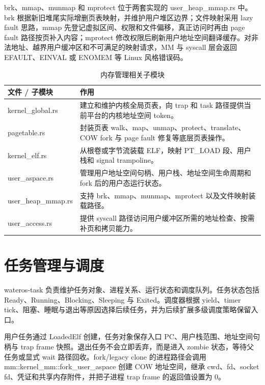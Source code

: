 \documentclass[12pt,openany,oneside,AutoFakeBold=true]{ctexbook}
\newcommand{\code}[1]{\textnormal{\rmfamily #1}}
\newcommand{\syscall}[1]{\textnormal{\rmfamily #1}}
\begin{document}
\syscall{brk}、\syscall{mmap}、\syscall{munmap} 和 \syscall{mprotect} 位于两套实现的 \code{user\_heap\_mmap.rs} 中。\syscall{brk} 根据新旧堆尾实际增删页表映射，并维护用户堆区边界；文件映射采用 lazy fault 思路，\syscall{mmap} 先登记虚拟区间、权限和文件偏移，真正访问时再由 page fault 路径按页补入内容；\syscall{mprotect} 修改权限后刷新用户地址空间翻译缓存。对非法地址、越界用户缓冲区和不可满足的映射请求，MM 与 syscall 层会返回 \code{EFAULT}、\code{EINVAL} 或 \code{ENOMEM} 等 Linux 风格错误码。

\begin{longtable}{>{\raggedright\arraybackslash}p{4.5cm}>{\raggedright\arraybackslash}p{8.8cm}}
  \caption{内存管理相关子模块}\label{tab:mm-submodules}\\
  \toprule[1.5pt]
  文件 / 子模块 & 作用 \\
  \midrule[1pt]
  \code{kernel\_global.rs} & 建立和维护内核全局页表，向 trap 和 task 路径提供当前平台的内核地址空间 token。 \\
  \code{pagetable.rs} & 封装页表 walk、map、unmap、protect、translate、COW fork 与 page fault 修复等底层页表操作。 \\
  \code{kernel\_elf.rs} & 从根卷或字节流装载 ELF，映射 \code{PT\_LOAD} 段、用户栈和 signal trampoline。 \\
  \code{user\_aspace.rs} & 管理用户地址空间句柄、用户栈、地址空间生命周期和 fork 后的用户态运行状态。 \\
  \code{user\_heap\_mmap.rs} & 支持 \syscall{brk}、\syscall{mmap}、\syscall{munmap}、\syscall{mprotect} 以及文件映射装载路径。 \\
  \code{user\_access.rs} & 提供 syscall 路径访问用户缓冲区所需的地址检查、按需补页和拷贝能力。 \\
  \bottomrule[1.5pt]
\end{longtable}


\section{任务管理与调度}

\code{wateros-task} 负责维护任务对象、进程关系、运行状态和调度队列。任务状态包括 \code{Ready}、\code{Running}、\code{Blocking}、\code{Sleeping} 与 \code{Exited}。调度器根据 yield、timer tick、阻塞、睡眠与退出等原因选择后续任务，并为后续扩展多级调度策略保留入口。

用户任务通过 \code{LoadedElf} 创建，任务对象保存入口 PC、用户栈范围、地址空间句柄与 trap frame 快照。退出任务不会立即丢弃，而是进入 zombie 状态，等待父任务或显式 wait 路径回收。\syscall{fork}/legacy \syscall{clone} 的进程路径会调用 \code{mm::kernel\_mm::fork\_user\_aspace} 创建 COW 地址空间，继承 cwd、fd、socket fd、凭证和共享内存附件，并把子进程 trap frame 的返回值设置为 0。
\end{document}
